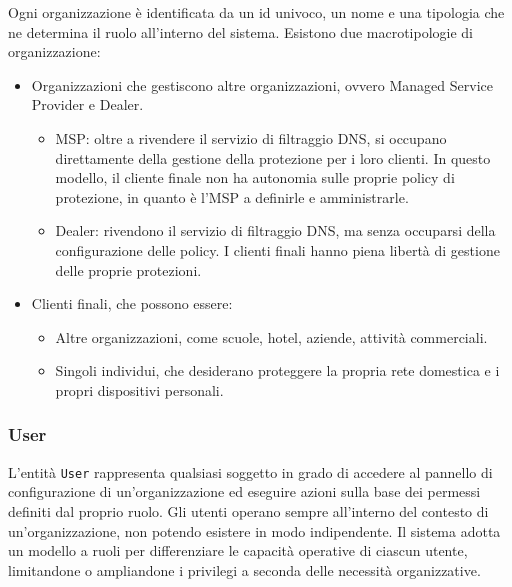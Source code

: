 Ogni organizzazione è identificata da un id univoco, un nome e una tipologia che ne determina il ruolo all'interno del sistema. Esistono due macrotipologie di organizzazione:
\begin{itemize}
  \item Organizzazioni che gestiscono altre organizzazioni, ovvero Managed Service Provider e Dealer.
    \begin{itemize}
      \item MSP: oltre a rivendere il servizio di filtraggio DNS, si occupano direttamente della gestione della protezione per i loro clienti. In questo modello, il cliente finale non ha autonomia sulle proprie policy di protezione, in quanto è l'MSP a definirle e amministrarle.
      \item Dealer: rivendono il servizio di filtraggio DNS, ma senza occuparsi della configurazione delle policy. I clienti finali hanno piena libertà di gestione delle proprie protezioni.
    \end{itemize}
  \item Clienti finali, che possono essere:
    \begin{itemize}
      \item Altre organizzazioni, come scuole, hotel, aziende, attività commerciali.
      \item Singoli individui, che desiderano proteggere la propria rete domestica e i propri dispositivi personali.
    \end{itemize}
\end{itemize}

\subsubsection{User}
L'entità \texttt{User} rappresenta qualsiasi soggetto in grado di accedere al pannello di configurazione di un'organizzazione ed eseguire azioni sulla base dei permessi definiti dal proprio ruolo. Gli utenti operano sempre all'interno del contesto di un'organizzazione, non potendo esistere in modo indipendente. Il sistema adotta un modello a ruoli per differenziare le capacità operative di ciascun utente, limitandone o ampliandone i privilegi a seconda delle necessità organizzative.

